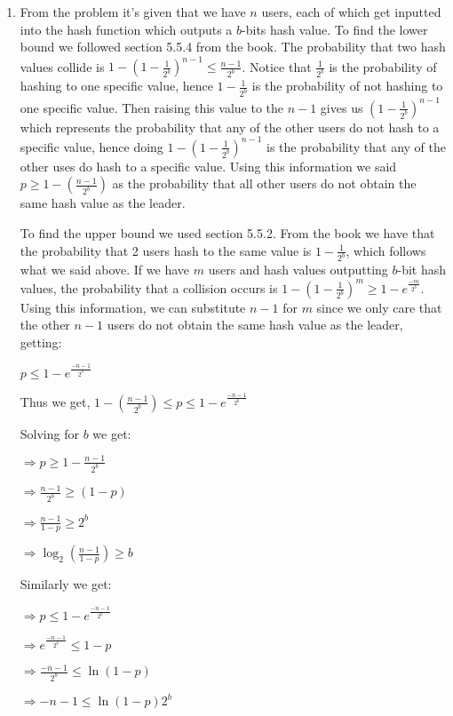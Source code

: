 \documentclass[11pt]{amsart}
\begin{document}
\begin{enumerate}
{ }
\item {}

{
From the problem it's given that we have $n$ users, each of which get inputted into the hash function which outputs a $b$-bits hash value.  To find the lower bound we followed section 5.5.4 from the book.  The probability that two hash values collide is $1-(1-\frac{1}{2^b})^{n-1} \leq \frac{n-1}{2^b}$.  Notice that $\frac{1}{2^b}$ is the probability of hashing to one specific value, hence $1-\frac{1}{2^b}$ is the probability of not hashing to one specific value. Then raising this value to the $n-1$ gives us $(1-\frac{1}{2^b})^{n-1}$ which represents the probability that any of the other users do not hash to a specific value, hence doing $1-(1-\frac{1}{2^b})^{n-1}$ is the probability that any of the other uses do hash to a specific value. Using this information we said $p \geq 1-(\frac{n-1}{2^b})$ as the probability that all other users do not obtain the same hash value as the leader.

To find the upper bound we used section 5.5.2. From the book we have that the probability that 2 users hash to the same value is $1-\frac{1}{2^b}$, which follows what we said above. If we have $m$ users and hash values outputting $b$-bit hash values, the probability that a collision occurs is $1-(1-\frac{1}{2^b})^m \geq 1-e^{\frac{-m}{2^b}}$.  Using this information, we can substitute $n-1$ for $m$ since we only care that the other $n-1$ users do not obtain the same hash value as the leader, getting:

$p \leq  1- e^{\frac{-n-1}{2^b}} $

Thus we get, $ 1-(\frac{n-1}{2^b}) \leq p \leq  1- e^{\frac{-n-1}{2^b}}$

Solving for $b$ we get:

$\Rightarrow p \geq 1 - \frac{n-1}{2^b}$

$\Rightarrow \frac{n-1}{2^b} \geq (1-p)$

$\Rightarrow \frac{n-1}{1-p} \geq 2^b$

$\Rightarrow \log_2(\frac{n-1}{1-p}) \geq b$

Similarly we get:

$\Rightarrow p \leq 1 - e^{\frac{-n-1}{2^b}}$

$\Rightarrow e^{\frac{-n-1}{2^b}} \leq 1-p$

$\Rightarrow \frac{-n-1}{2^b} \leq \ln(1-p)$

$\Rightarrow -n-1 \leq \ln(1-p)2^b     $

}
\end{enumerate}
\end{document}
